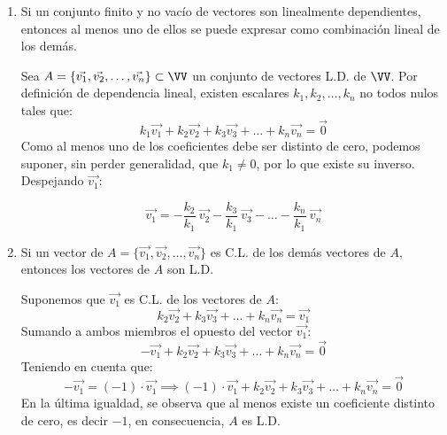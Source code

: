 \begin{enumerate}
    \item Si un conjunto finito y no vacío de vectores son linealmente dependientes, entonces al menos uno de ellos se puede expresar como combinación lineal de los demás.
    
    \begin{demostracionbox}        
        Sea $A = \{\vec{v_1}, \vec{v_2}, \dots, \vec{v_n}\} \subset \VV$ un conjunto de vectores L.D. de $\VV$. Por definición de dependencia lineal, existen escalares $k_1, k_2, \dots, k_n$ no todos nulos tales que:        
            \begin{equation*}
                k_1 \vec{v_1} + k_2 \vec{v_2} + k_3 \vec{v_3} + \dots + k_n \vec{v_n} = \vec{0}
            \end{equation*}
        Como al menos uno de los coeficientes debe ser distinto de cero, podemos suponer, sin perder generalidad, que $k_1 \neq 0$, por lo que existe su inverso. Despejando $\vec{v_1}$:
        
        \begin{equation*}
            \vec{v_1} = -\frac{k_2}{k_1}\ \vec{v_2} - \frac{k_3}{k_1}\ \vec{v_3} - \dots - \frac{k_n}{k_1}\ \vec{v_n}
        \end{equation*}
    \end{demostracionbox}


    \item Si un vector de $A = \{\vec{v_1}, \vec{v_2}, \dots, \vec{v_n}\}$ es C.L. de los demás vectores de $A$, entonces los vectores de $A$ son L.D.
    
    \begin{demostracionbox}        
        Suponemos que $\vec{v_1}$ es C.L. de los vectores de $A$:
            \begin{equation*}
                k_2 \vec{v_2} + k_3 \vec{v_3} + \dots + k_n \vec{v_n} = \vec{v_1}
            \end{equation*}
        Sumando a ambos miembros el opuesto del vector $\vec{v_1}$:
            \begin{equation*}
                -\vec{v_1} + k_2 \vec{v_2} + k_3 \vec{v_3} + \dots + k_n \vec{v_n} = \vec{0}
            \end{equation*}        
        Teniendo en cuenta que:
            \begin{equation*}
                -\vec{v_1} = (-1)\cdot\vec{v_1} \implies (-1)\cdot\vec{v_1} + k_2 \vec{v_2} + k_3 \vec{v_3} + \dots + k_n \vec{v_n} = \vec{0}
            \end{equation*}
        En la última igualdad, se observa que al menos existe un coeficiente distinto de cero, es decir $-1$, en consecuencia, $A$ es L.D.
    \end{demostracionbox}


\end{enumerate}
